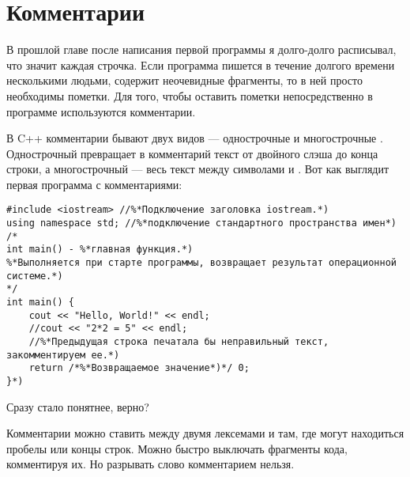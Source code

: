 \documentclass{article}
\begin{document}



\maketitle 

\section*{Комментарии}

В прошлой главе после написания первой программы я долго-долго расписывал, что значит каждая строчка. Если программа пишется в течение долгого времени несколькими людьми, содержит неочевидные фрагменты, то в ней просто необходимы пометки. Для того, чтобы оставить пометки непосредственно в программе используются комментарии.


В C++ комментарии бывают двух видов --- однострочные \cppword{//} и многострочные \cppword{/**/}. Однострочный превращает в комментарий текст от двойного слэша \cppword{//} до конца строки, а многострочный --- весь текст между символами \cppword{/*} и \cppword{*/}. Вот как выглядит первая программа с комментариями:

\begin{lstlisting}[caption={Программа с комментариями}, captionpos=b, style=cpp]
#include <iostream> //%*Подключение заголовка iostream.*)
using namespace std; //%*подключение стандартного пространства имен*)
/*
int main() - %*главная функция.*)
%*Выполняется при старте программы, возвращает результат операционной системе.*)
*/
int main() {
	cout << "Hello, World!" << endl;
	//cout << "2*2 = 5" << endl;
	//%*Предыдущая строка печатала бы неправильный текст, закомментируем ее.*)
	return /*%*Возвращаемое значение*)*/ 0;
}*)
\end{lstlisting}

Сразу стало понятнее, верно?

Комментарии можно ставить между двумя лексемами и там, где могут находиться пробелы или концы строк. Можно быстро выключать фрагменты кода, комментируя их.  Но разрывать слово комментарием нельзя.
\end{document}
